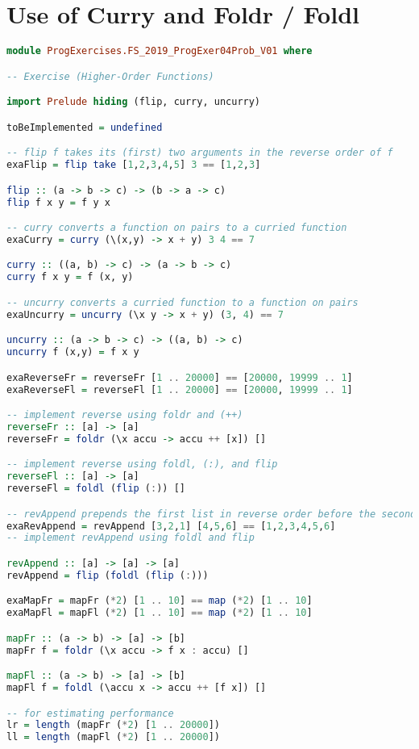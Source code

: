 \section{Use of Curry and Foldr / Foldl}

\begin{lstlisting}[language=Haskell]
module ProgExercises.FS_2019_ProgExer04Prob_V01 where

-- Exercise (Higher-Order Functions)

import Prelude hiding (flip, curry, uncurry)

toBeImplemented = undefined

-- flip f takes its (first) two arguments in the reverse order of f
exaFlip = flip take [1,2,3,4,5] 3 == [1,2,3]

flip :: (a -> b -> c) -> (b -> a -> c)
flip f x y = f y x

-- curry converts a function on pairs to a curried function
exaCurry = curry (\(x,y) -> x + y) 3 4 == 7

curry :: ((a, b) -> c) -> (a -> b -> c)
curry f x y = f (x, y)

-- uncurry converts a curried function to a function on pairs
exaUncurry = uncurry (\x y -> x + y) (3, 4) == 7

uncurry :: (a -> b -> c) -> ((a, b) -> c)
uncurry f (x,y) = f x y

exaReverseFr = reverseFr [1 .. 20000] == [20000, 19999 .. 1]
exaReverseFl = reverseFl [1 .. 20000] == [20000, 19999 .. 1]

-- implement reverse using foldr and (++)
reverseFr :: [a] -> [a]
reverseFr = foldr (\x accu -> accu ++ [x]) []

-- implement reverse using foldl, (:), and flip
reverseFl :: [a] -> [a]
reverseFl = foldl (flip (:)) []

-- revAppend prepends the first list in reverse order before the second list
exaRevAppend = revAppend [3,2,1] [4,5,6] == [1,2,3,4,5,6]
-- implement revAppend using foldl and flip

revAppend :: [a] -> [a] -> [a]
revAppend = flip (foldl (flip (:)))

exaMapFr = mapFr (*2) [1 .. 10] == map (*2) [1 .. 10]
exaMapFl = mapFl (*2) [1 .. 10] == map (*2) [1 .. 10]

mapFr :: (a -> b) -> [a] -> [b]
mapFr f = foldr (\x accu -> f x : accu) []

mapFl :: (a -> b) -> [a] -> [b]
mapFl f = foldl (\accu x -> accu ++ [f x]) []

-- for estimating performance
lr = length (mapFr (*2) [1 .. 20000])
ll = length (mapFl (*2) [1 .. 20000])


\end{lstlisting}
